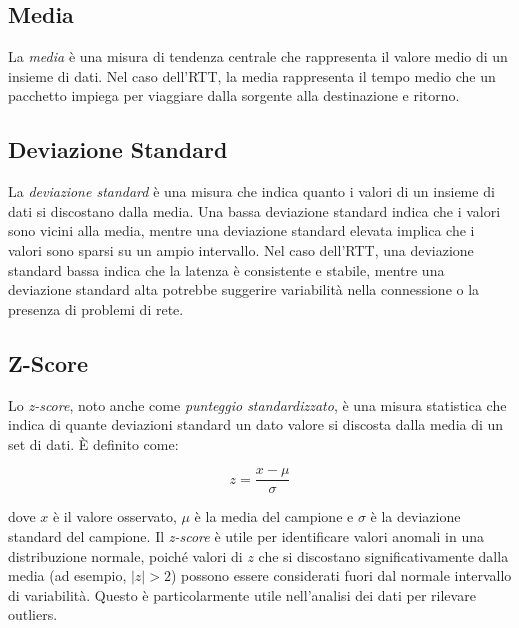 \subsection{Media}

La \textit{media} è una misura di tendenza centrale che rappresenta il valore medio di un insieme di dati. Nel caso dell'RTT, la media rappresenta il tempo medio che un pacchetto impiega per viaggiare dalla sorgente alla destinazione e ritorno.

\subsection{Deviazione Standard}

La \textit{deviazione standard} è una misura che indica quanto i valori di un insieme di dati si discostano dalla media. Una bassa deviazione standard indica che i valori sono vicini alla media, mentre una deviazione standard elevata implica che i valori sono sparsi su un ampio intervallo. Nel caso dell'RTT, una deviazione standard bassa indica che la latenza è consistente e stabile, mentre una deviazione standard alta potrebbe suggerire variabilità nella connessione o la presenza di problemi di rete.

\subsection{Z-Score}

Lo \textit{z-score}, noto anche come \textit{punteggio standardizzato}, è una misura statistica che indica di quante deviazioni standard un dato valore si discosta dalla media di un set di dati. È definito come:

\[
z = \frac{x - \mu}{\sigma}
\]

dove \( x \) è il valore osservato, \( \mu \) è la media del campione e \( \sigma \) è la deviazione standard del campione. Il \textit{z-score} è utile per identificare valori anomali in una distribuzione normale, poiché valori di \( z \) che si discostano significativamente dalla media (ad esempio, \( |z| > 2 \)) possono essere considerati fuori dal normale intervallo di variabilità. Questo è particolarmente utile nell'analisi dei dati per rilevare outliers.
